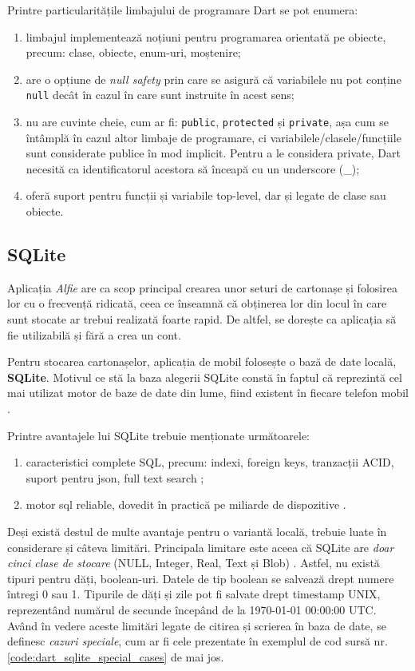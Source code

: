 Printre particularitățile limbajului de programare Dart se pot enumera: \cite{dartBasics}
\begin{enumerate}
    \item limbajul implementează noțiuni pentru programarea orientată pe obiecte, precum: clase, obiecte, enum-uri, moștenire;
    \item are o opțiune de \textit{null safety} prin care se asigură că variabilele nu pot conține \texttt{null} decât în cazul în care sunt instruite în acest sens;
    \item nu are cuvinte cheie, cum ar fi: \texttt{public}, \texttt{protected} și \texttt{private}, așa cum se întâmplă în cazul altor limbaje de programare, ci variabilele/clasele/funcțiile sunt considerate publice în mod implicit. Pentru a le considera private, Dart necesită ca identificatorul acestora să înceapă cu un underscore (\_);
    \item oferă suport pentru funcții și variabile top-level, dar și legate de clase sau obiecte.
\end{enumerate}

\subsection{SQLite}

Aplicația \textit{Alfie} are ca scop principal crearea unor seturi de cartonașe și folosirea lor cu o frecvență ridicată, ceea ce înseamnă că obținerea lor din locul în care sunt stocate ar trebui realizată foarte rapid. De altfel, se dorește ca aplicația să fie utilizabilă și fără a crea un cont.

Pentru stocarea cartonașelor, aplicația de mobil folosește o bază de date locală, \textbf{SQLite}. Motivul ce stă la baza alegerii SQLite constă în faptul că reprezintă cel mai utilizat motor de baze de date din lume, fiind existent în fiecare telefon mobil \cite{sqlite}.

Printre avantajele lui SQLite trebuie menționate următoarele:
\begin{enumerate}
    \item caracteristici complete SQL, precum: indexi, foreign keys, tranzacții ACID, suport pentru json, full text search \cite{sqliteFeatures};
    \item motor sql reliable, dovedit în practică pe miliarde de dispozitive \cite{sqliteReliability}.
\end{enumerate}

Deși există destul de multe avantaje pentru o variantă locală, trebuie luate în considerare și câteva limitări. Principala limitare este aceea că SQLite are \textit{doar cinci clase de stocare} (NULL, Integer, Real, Text și Blob) \cite{sqliteDatatypes}. Astfel, nu există tipuri pentru dăți, boolean-uri. Datele de tip boolean se salvează drept numere întregi 0 sau 1. Tipurile de dăți și zile pot fi salvate drept timestamp UNIX, reprezentând numărul de secunde începând de la 1970-01-01 00:00:00 UTC. Având în vedere aceste limitări legate de citirea și scrierea în baza de date, se definesc \textit{cazuri speciale}, cum ar fi cele prezentate în exemplul de cod sursă nr. \ref{code:dart_sqlite_special_cases} de mai jos.

